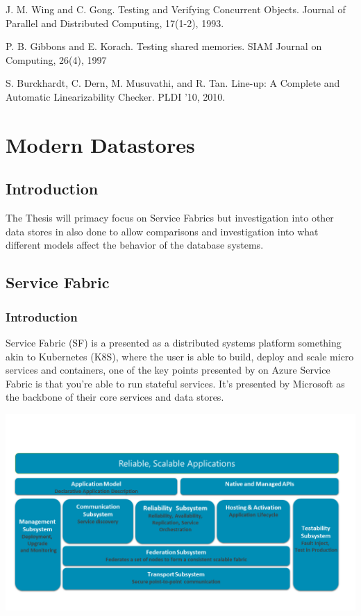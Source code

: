 \documentclass[a4paper,10pt,titlepage]{report}
\begin{document}
J. M. Wing and C. Gong. Testing and Verifying
Concurrent Objects. Journal of Parallel and
Distributed Computing, 17(1-2), 1993.

P. B. Gibbons and E. Korach. Testing shared
memories. SIAM Journal on Computing, 26(4), 1997

S. Burckhardt, C. Dern, M. Musuvathi, and R. Tan.
Line-up: A Complete and Automatic Linearizability
Checker. PLDI ’10, 2010.






\newpage
\section{Modern Datastores}



\subsection{Introduction}

The Thesis will primacy focus on Service Fabrics but investigation into other data stores in also done to allow comparisons and investigation into what different models affect the behavior of the database systems.

\subsection{Service Fabric}


\subsubsection{Introduction}

Service Fabric (SF) is a presented as a distributed systems platform something akin to Kubernetes (K8S), where the user is able to build, deploy and scale micro services and containers, one of the key points presented by on Azure Service Fabric is that you're able to run stateful services. It's presented by Microsoft as the backbone of their core services and data stores.

\includegraphics[scale=0.5]{Report/images/service-fabric-architecture.png}
\end{document}
